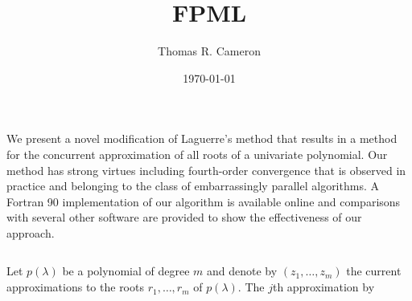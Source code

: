 \documentclass[orientation=portrait]{tikzposter}
\title{FPML}
\author{Thomas R. Cameron}
\date{\today}
\institute{Davidson College}
\begin{document}
 
\maketitle

{
We present a novel modification of Laguerre's method that results in a method for the concurrent approximation of all roots of a univariate polynomial. Our method has strong virtues including fourth-order convergence that is observed in practice and belonging to the class of embarrassingly parallel algorithms. A Fortran 90 implementation of our algorithm is available online and comparisons with several other software are provided to show the effectiveness of our approach.
}

\begin{columns}
	{
		Let $p(\lambda)$ be a polynomial of degree $m$ and denote by $(z_{1},\ldots,z_{m})$ the current approximations to the roots $r_{1},\ldots,r_{m}$ of $p(\lambda)$. The $j$th approximation by 
	}
	
\end{columns}
 
\end{document}
